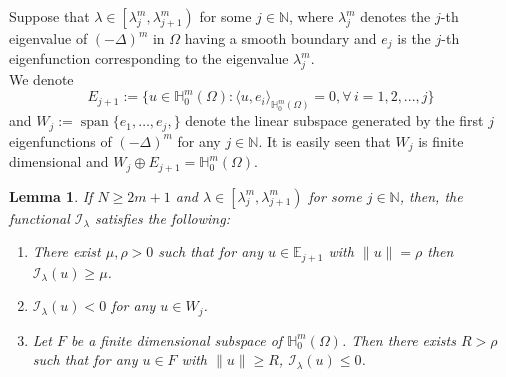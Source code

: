 \documentclass[reqno]{amsart}
\newtheorem{lemma}[theorem]{Lemma}
\newcommand{\la} {\lambda}
\newcommand{\Om}{\Omega}
\newcommand{\noi} {  \noindent}
\newcommand{\mb} {\mathbb}
\newcommand{\mc} {\mathcal}
\numberwithin{theorem}{section} \numberwithin{equation}{section}
\begin{document}
\vspace{0.2cm}

\noi Suppose that $\la \in\left[\la^m_j, \la^m_{j+1}\right)$ for some $j\in\mb{N}$, where $\la^m_j$ denotes the $j$-th eigenvalue of $(-\Delta)^m$ in $\Om$ having a smooth boundary and $e_j$ is the $j$-th eigenfunction corresponding to the eigenvalue $\la^m_j$.\\
We denote
\[E_{j+1} := \{u\in \mb{H}^m_0(\Om): \langle u, e_i \rangle_{\mb{H}^m_0(\Om)} = 0, \forall \,    i = 1, 2, . . . , j\}\]
and $W_j :=\operatorname{span}\{e_1, \ldots, e_j, \}$  denote the linear subspace generated by the first $j$ eigenfunctions of $(-\Delta)^m$
for any $j\in\mb{N}$. It is easily seen that $W_j$ is finite dimensional and $W_j \oplus E_{j+1} =\mb{H}^m_0(\Om)$.
\begin{lemma}\label{l10}
If $N\geq2m+1$ and $\la \in\left[\la^m_j, \la^m_{j+1}\right)$ for some $j \in \mb{N}$, then, the functional $\mc{I}_\la$ satisfies the following:
\begin{enumerate}
\item There exist $\mu, \rho>0$ such that for any $u \in \mb{E}_{j+1}$ with $\|u\|=\rho$ then $\mc{I}_\la(u) \geq \mu$.
\item  $\mc{I}_\la(u)<0$ for any $u \in {W}_j$.
\item  Let $F$ be a finite dimensional subspace of $\mb{H}_0^m(\Om)$. Then there exists $R>\rho$ such that for any $u \in F$ with $\|u\| \geq R$, $\mc{I}_\la(u) \leq 0$.
\end{enumerate}\end{lemma}
\end{document}
